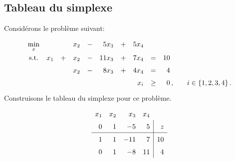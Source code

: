 %

\subsection{Tableau du simplexe}

\begin{myexem}
	Considérons le problème suivant:
	\[
	\renewcommand{\arraystretch}{1.5}
	\begin{array}{c@{\quad}rcrcrcrcr@{\qquad}l}
		\min\limits_{x} &&& x_2 & - & 5 x_3 & + & 5 x_4 &&& \\
		\textnormal{s.t.} & x_1 & + & x_2 & - & 11 x_3 & + & 7 x_4 & = & 10\phantom{\,,} & \\
		&&& x_2 & - & 8 x_3 & + & 4 x_4 & = & 4\phantom{\,,} & \\
		&&&&&&& x_i & \ge & 0\,, & i \in \{1,2,3,4\}\,.
	\end{array}
	\]
	Construisons le tableau du simplexe pour ce problème.
	\[
	\renewcommand{\arraystretch}{1.5}
	\begin{array}{rrrr|r}
		x_1 & x_2 &  x_3 & \multicolumn{1}{r}{x_4} &    \\
		  0 &   1 &   -5 &                       5 &  z \\
		  \hline
		  1 &   1 &  -11 &                       7 & 10 \\
		  0 &   1 &   -8 &                      11 &  4
	\end{array}
	\]
\end{myexem}
